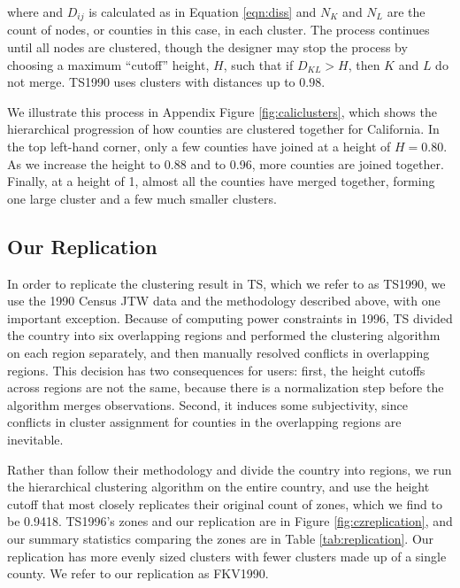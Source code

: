 where and $D_{ij}$ is calculated as in Equation \ref{eqn:diss} and $N_K$ and $N_L$ are the count of nodes, or counties in this case, in each cluster. The process continues until all nodes are clustered, though the designer may stop the process by choosing a maximum ``cutoff'' height, $H$, such that if $D_{KL}>H$, then $K$ and $L$ do not merge. TS1990 uses clusters with distances up to $0.98$.

We illustrate this process in Appendix Figure \ref{fig:caliclusters}, which shows the hierarchical progression of how counties are clustered together for California. In the top left-hand corner, only a few counties have joined at a height of $H=0.80$. As we increase the height to 0.88 and to 0.96, more counties are joined together. Finally, at a height of 1, almost all the counties have merged together, forming one large cluster and a few much smaller clusters.

\subsection{Our Replication}
\FloatBarrier

In order to replicate the clustering result in TS, which we refer to as TS1990, we use the 1990 Census JTW data and the methodology described above, with one important exception. Because of computing power constraints in 1996, TS divided the country into six overlapping regions and performed the clustering algorithm on each region separately, and then manually resolved conflicts in overlapping regions. This decision has two consequences for users: first, the height cutoffs across regions are not the same, because there is a normalization step before the algorithm merges observations. Second, it induces some subjectivity, since conflicts in cluster assignment for counties in the overlapping regions are inevitable.

Rather than follow their methodology and divide the country into regions, we run the hierarchical clustering algorithm on the entire country, and use the height cutoff that most closely replicates their original count of zones, which we find to be 0.9418. TS1996's zones and our replication are in Figure \ref{fig:czreplication}, and our summary statistics comparing the zones are in Table \ref{tab:replication}. Our replication has more evenly sized clusters with fewer clusters made up of a single county. We refer to our replication as FKV1990.

